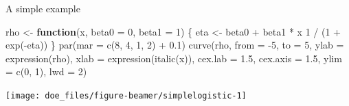 \documentclass[
  ignorenonframetext,
]{beamer}
\newenvironment{Shaded}{\begin{snugshade}}{\end{snugshade}}
\newcommand{\AttributeTok}[1]{\textcolor[rgb]{0.77,0.63,0.00}{#1}}
\newcommand{\ControlFlowTok}[1]{\textcolor[rgb]{0.13,0.29,0.53}{\textbf{#1}}}
\newcommand{\DecValTok}[1]{\textcolor[rgb]{0.00,0.00,0.81}{#1}}
\newcommand{\FloatTok}[1]{\textcolor[rgb]{0.00,0.00,0.81}{#1}}
\newcommand{\FunctionTok}[1]{\textcolor[rgb]{0.00,0.00,0.00}{#1}}
\newcommand{\NormalTok}[1]{#1}
\newcommand{\OtherTok}[1]{\textcolor[rgb]{0.56,0.35,0.01}{#1}}
\newcommand{\SpecialCharTok}[1]{\textcolor[rgb]{0.00,0.00,0.00}{#1}}
\begin{document}
\begin{frame}[fragile]{A simple example}
\protect\hypertarget{a-simple-example}{}
\begin{Shaded}
\begin{Highlighting}[]
\NormalTok{rho }\OtherTok{\textless{}{-}} \ControlFlowTok{function}\NormalTok{(x, }\AttributeTok{beta0 =} \DecValTok{0}\NormalTok{, }\AttributeTok{beta1 =} \DecValTok{1}\NormalTok{) \{}
\NormalTok{  eta }\OtherTok{\textless{}{-}}\NormalTok{ beta0 }\SpecialCharTok{+}\NormalTok{ beta1 }\SpecialCharTok{*}\NormalTok{ x}
  \DecValTok{1} \SpecialCharTok{/}\NormalTok{ (}\DecValTok{1} \SpecialCharTok{+} \FunctionTok{exp}\NormalTok{(}\SpecialCharTok{{-}}\NormalTok{eta))}
\NormalTok{\}}
\FunctionTok{par}\NormalTok{(}\AttributeTok{mar =} \FunctionTok{c}\NormalTok{(}\DecValTok{8}\NormalTok{, }\DecValTok{4}\NormalTok{, }\DecValTok{1}\NormalTok{, }\DecValTok{2}\NormalTok{) }\SpecialCharTok{+} \FloatTok{0.1}\NormalTok{)}
\FunctionTok{curve}\NormalTok{(rho, }\AttributeTok{from =} \SpecialCharTok{{-}}\DecValTok{5}\NormalTok{, }\AttributeTok{to =} \DecValTok{5}\NormalTok{, }\AttributeTok{ylab =} \FunctionTok{expression}\NormalTok{(rho), }\AttributeTok{xlab =} \FunctionTok{expression}\NormalTok{(}\FunctionTok{italic}\NormalTok{(x)), }\AttributeTok{cex.lab =} \FloatTok{1.5}\NormalTok{, }
      \AttributeTok{cex.axis =} \FloatTok{1.5}\NormalTok{, }\AttributeTok{ylim =} \FunctionTok{c}\NormalTok{(}\DecValTok{0}\NormalTok{, }\DecValTok{1}\NormalTok{), }\AttributeTok{lwd =} \DecValTok{2}\NormalTok{)}
\end{Highlighting}
\end{Shaded}

\begin{center}\texttt{[image: doe\_files/figure-beamer/simplelogistic-1]} \end{center}
\end{frame}
\end{document}
